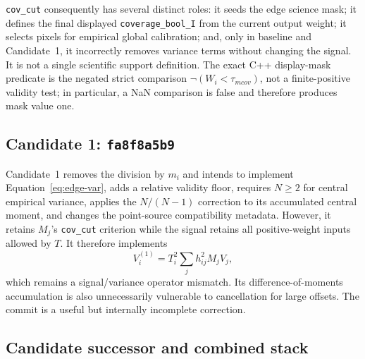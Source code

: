 \documentclass[11pt]{article}
\newcommand{\code}[1]{\nolinkurl{#1}}
\begin{document}
\code{cov_cut} consequently has several distinct roles: it seeds the edge
science mask; it defines the final displayed \code{coverage_bool_I} from the
current output weight; it selects pixels for empirical global calibration;
and, only in baseline and Candidate~1, it incorrectly removes variance terms
without changing the signal.  It is not a single scientific support
definition.  The exact C++ display-mask predicate is the negated strict
comparison $\neg(W_i<\tau_{
m cov})$, not a finite-positive validity test;
in particular, a NaN comparison is false and therefore produces mask value
one.

\subsection{Candidate 1: \texttt{fa8f8a5b9}}

Candidate~1 removes the division by $m_i$ and intends to implement
Equation~\eqref{eq:edge-var}, adds a relative validity floor, requires
$N\ge2$ for central empirical variance, applies the $N/(N-1)$ correction to
its accumulated central moment, and changes the point-source compatibility
metadata.  However, it retains $M_j$'s \code{cov_cut} criterion while the
signal retains all positive-weight inputs allowed by $T$.  It therefore
implements
\begin{equation}
 V_i^{(1)}=T_i^2\sum_jh_{ij}^2M_jV_j,
 \label{eq:candidate1-var}
\end{equation}
which remains a signal/variance operator mismatch.  Its difference-of-moments
accumulation is also unnecessarily vulnerable to cancellation for large
offsets.  The commit is a useful but internally incomplete correction.

\subsection{Candidate successor and combined stack}
\end{document}
